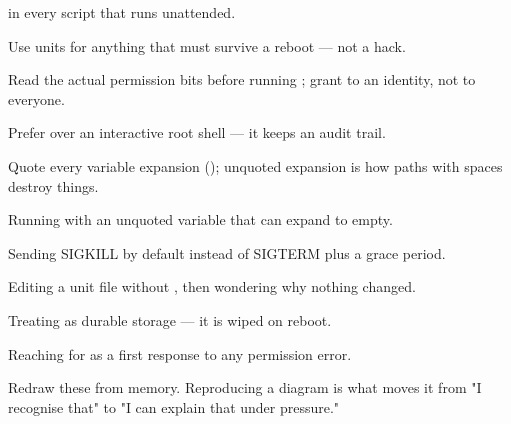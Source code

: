 \begin{bestpractices}
\begin{wbitem}
  \item {} in every script that runs unattended.
  \item Use  units for anything that must survive a reboot --- not a  hack.
  \item Read the actual permission bits before running ; grant to an identity, not to everyone.
  \item Prefer  over an interactive root shell --- it keeps an audit trail.
  \item Quote every variable expansion (); unquoted expansion is how paths with spaces destroy things.
\end{wbitem}
\end{bestpractices}
\begin{mistakes}
\begin{wbitem}
  \item Running  with an unquoted variable that can expand to empty.
  \item Sending SIGKILL by default instead of SIGTERM plus a grace period.
  \item Editing a unit file without , then wondering why nothing changed.
  \item Treating  as durable storage --- it is wiped on reboot.
  \item Reaching for  as a first response to any permission error.
\end{wbitem}
\end{mistakes}


Redraw these from memory. Reproducing a diagram is what moves it from "I recognise that" to "I can explain that under pressure."

\begin{writespace}
\end{writespace}

\begin{writespace}
\end{writespace}

